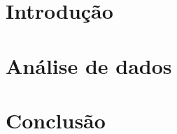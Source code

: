 \documentclass[11pt]{article}
\begin{document}


\newpage{}
\tableofcontents{}
\newpage{}

\section{Introdução}
\label{section: intro}


\section{Análise de dados}









\section{Conclusão}
\label{section: conclusao}

\end{document}
